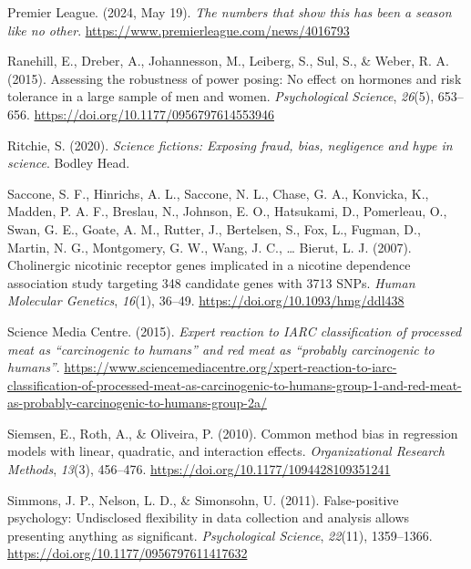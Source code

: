 \documentclass[
]{book}
\newlength{\cslhangindent}
\newenvironment{CSLReferences}[2] %
 {\begin{list}{}{%
  \setlength{\itemindent}{0pt}
  \setlength{\leftmargin}{0pt}
  \setlength{\parsep}{0pt}
  \ifodd #1
   \setlength{\leftmargin}{\cslhangindent}
   \setlength{\itemindent}{-1\cslhangindent}
  \fi
  \setlength{\itemsep}{#2\baselineskip}}}
 {\end{list}}
\begin{document}
\begin{CSLReferences}{1}{0}
Premier League. (2024, May 19). \emph{The numbers that show this has been a season like no other}. \url{https://www.premierleague.com/news/4016793}

Ranehill, E., Dreber, A., Johannesson, M., Leiberg, S., Sul, S., \& Weber, R. A. (2015). Assessing the robustness of power posing: No effect on hormones and risk tolerance in a large sample of men and women. \emph{Psychological Science}, \emph{26}(5), 653--656. \url{https://doi.org/10.1177/0956797614553946}

Ritchie, S. (2020). \emph{Science fictions: Exposing fraud, bias, negligence and hype in science}. Bodley Head.

Saccone, S. F., Hinrichs, A. L., Saccone, N. L., Chase, G. A., Konvicka, K., Madden, P. A. F., Breslau, N., Johnson, E. O., Hatsukami, D., Pomerleau, O., Swan, G. E., Goate, A. M., Rutter, J., Bertelsen, S., Fox, L., Fugman, D., Martin, N. G., Montgomery, G. W., Wang, J. C., \ldots{} Bierut, L. J. (2007). Cholinergic nicotinic receptor genes implicated in a nicotine dependence association study targeting 348 candidate genes with 3713 {SNPs}. \emph{Human Molecular Genetics}, \emph{16}(1), 36--49. \url{https://doi.org/10.1093/hmg/ddl438}

Science Media Centre. (2015). \emph{Expert reaction to {IARC} classification of processed meat as {``carcinogenic to humans''} and red meat as {``probably carcinogenic to humans''}}. \url{https://www.sciencemediacentre.org/xpert-reaction-to-iarc-classification-of-processed-meat-as-carcinogenic-to-humans-group-1-and-red-meat-as-probably-carcinogenic-to-humans-group-2a/}

Siemsen, E., Roth, A., \& Oliveira, P. (2010). Common method bias in regression models with linear, quadratic, and interaction effects. \emph{Organizational Research Methods}, \emph{13}(3), 456--476. \url{https://doi.org/10.1177/1094428109351241}

Simmons, J. P., Nelson, L. D., \& Simonsohn, U. (2011). False-positive psychology: Undisclosed flexibility in data collection and analysis allows presenting anything as significant. \emph{Psychological Science}, \emph{22}(11), 1359--1366. \url{https://doi.org/10.1177/0956797611417632}


\end{CSLReferences}
\end{document}
